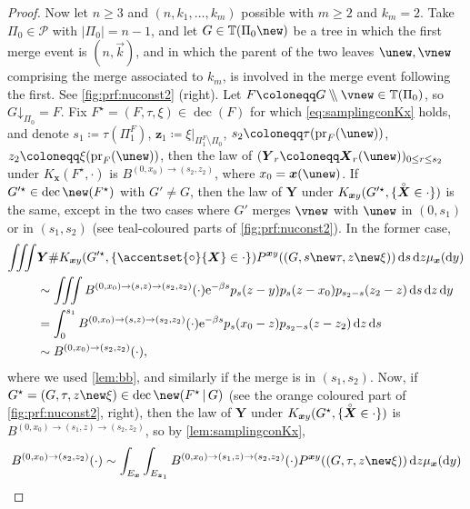 \documentclass[reqno,draft]{amsart}
\numberwithin{equation}{section}
\theoremstyle{plain}
\theoremstyle{remark}
\newcommand*\diff{\mathop{}\!\mathrm{d}}
\newcommand{\e}{\mathrm{e}}
\DeclareMathOperator{\pr}{pr}
\newcommand{\fpart}{\Pi} %
\DeclareMathOperator{\dcb}{dec}
\newcommand{\wo}{\mathbin{{\setminus}\mspace{-5mu}{\setminus}}}
\newcommand{\la}{\beta} %
\newcommand{\rs}[1]{\accentset{\circ}{#1}} %
\newcommand{\rsto}[1]{\mathord\downarrow_{#1}}
\begin{document}
\begin{proof}
    Now let $n \ge 3$ and $(n,k_1, \ldots ,k_m)$ possible with $m\ge 2$ and $k_m = 2$. Take $\fpart_0\in \mathcal{P}$ with $|\fpart_0| = n-1$, and let $G\in \mathbb{T}(\fpart_0\new)$ be a tree in which the first merge event is $(n,\vec{k})$, and in which the parent of the two leaves $\unew,\vnew$ comprising the merge associated to $k_m$, is involved in the merge event following the first. See \cref{fig:prf:nuconst2} (right). Let $F\coloneqq G \wo \vnew \in \mathbb{T}(\fpart_0)$, so $G\rsto{\fpart_0} = F$. Fix $F^\star = (F,\tau,\xi) \in \dcb(F)$ for which \cref{eq:samplingconKx} holds, and denote $s_1\coloneqq \tau(\fpart^F_1)$, $\boldsymbol z_1 \coloneqq \xi\vert_{\fpart^F_1 \setminus \fpart_0}$, $s_2\coloneqq \tau(\pr_F(\unew))$, $z_2\coloneqq \xi(\pr_F(\unew))$, then the law of $(\boldsymbol Y_r\coloneqq \boldsymbol X_r(\unew))_{0\le r \le s_2}$ under $K_{\boldsymbol x}(F^\star,\cdot )$ is $B^{(0,x_0)\to(s_2,z_2)}$, where $x_0 = \boldsymbol x(\unew)$. If $G'^\star \in \dcb\new(F^\star)$ with $G'\neq G$, then the law of $\boldsymbol Y$ under $K_{\boldsymbol x y}(G'^\star,\{\rs{\boldsymbol X}\in\cdot \})$ is the same,
    except in the two cases where $G'$ merges $\vnew $ with $\unew$ in $(0,s_1)$ or in $(s_1,s_2)$ (see teal-coloured parts of \cref{fig:prf:nuconst2}). In the former case,
    \begin{align*}
        \iiint & \boldsymbol Y\# K_{\boldsymbol x y}(G'^\star,\{\rs{\boldsymbol X}\in\cdot \}) P^{\boldsymbol x y}((G,s\new\tau,z\new\xi)) \diff s\diff z \mu_{\boldsymbol x}(\diff y)\\
        &\sim \iiint B^{(0,x_0)\to(s,z)\to(s_2,z_2)}(\cdot ) \e^{-\la s} p_s(z-y) p_s(z-x_0) p_{s_2-s}(z_2-z) \diff s\diff z\diff y\\
        &= \int_0^{s_1} B^{(0,x_0)\to(s,z)\to(s_2,z_2)}(\cdot ) \e^{-\la s} p_s(x_0-z) p_{s_2-s}(z-z_2) \diff z \diff s\\
        &\sim B^{(0,x_0) \to (s_2,z_2)}(\cdot ),
    \end{align*}
    where we used \cref{lem:bb}, and similarly if the merge is in $(s_1,s_2)$. Now, if $G^\star = (G,\tau,z\new\xi) \in \dcb\new(F^\star \,\vert\,G)$ (see the orange coloured part of \cref{fig:prf:nuconst2}, right), then the law of $\boldsymbol Y$ under $K_{\boldsymbol x y}(G^\star,\{\rs{\boldsymbol X}\in\cdot \})$ is $B^{(0,x_0) \to (s_1,z) \to (s_2,z_2)}$, so by \cref{lem:samplingconKx},
    \begin{align*}
        B^{(0,x_0) \to (s_2,z_2)}(\cdot )
        &\sim \int_{E_{\boldsymbol x}} \int_{E_{\boldsymbol z_1}} B^{(0,x_0)\to(s_1,z)\to(s_2,z_2)}(\cdot ) P^{\boldsymbol x y}((G,\tau,z\new\xi)) \diff z \mu_{\boldsymbol x}(\diff y)\\

\end{align*}
\end{proof}
\end{document}
